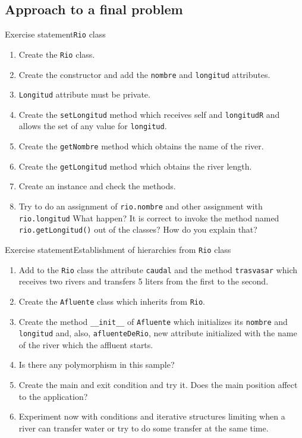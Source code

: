 \documentclass[10pt,compress]{beamer} %
\begin{document}
\subsection{Approach to a final problem}
\begin{frame}{Exercise statement}{\texttt{Rio} class}
\vspace{-0.24cm}
	\begin{enumerate}
		\item Create the \texttt{Rio} class. 
		\item Create the constructor and add the \texttt{nombre} and \texttt{longitud} attributes.
		\item \texttt{Longitud} attribute must be private.
		\item Create the \texttt{setLongitud} method which receives self and \texttt{longitudR} and allows the set of any value for \texttt{longitud}.
		\item Create the \texttt{getNombre} method which obtains the name of the river.
		\item Create the \texttt{getLongitud} method which obtains the river length.		 
		\item Create an instance and check the methods.
		\item Try to do an assignment of \texttt{rio.nombre} and other assignment with  \texttt{rio.longitud} What happen? It is correct  to invoke the method named \texttt{rio.getLongitud()} out of the classes? How do you explain that?
	\end{enumerate}	
\end{frame}

\begin{frame}{Exercise statement}{Establishment of hierarchies from \texttt{Rio} class}
\vspace{-0.24cm}
	\begin{enumerate}
		\item Add to the \texttt{Rio} class the attribute \texttt{caudal} and the method \texttt{trasvasar} which receives two rivers and transfers 5 liters from the first to the second.
		\item Create the \texttt{Afluente} class which inherits from \texttt{Rio}.		
		\item Create the method \texttt{\_\_init\_\_} of \texttt{Afluente} which initializes its \texttt{nombre} and \texttt{longitud} and, also,  \texttt{afluenteDeRio}, new attribute initialized with the name of the river which the affluent starts.
		\item Is there any polymorphism in this sample?
		\item Create the main and exit condition and try it. Does the main position affect to the application? 
		\item Experiment now with conditions and iterative structures limiting when a river can transfer water or try to do some transfer at the same time.

	\end{enumerate}	
\end{frame}
\end{document}
